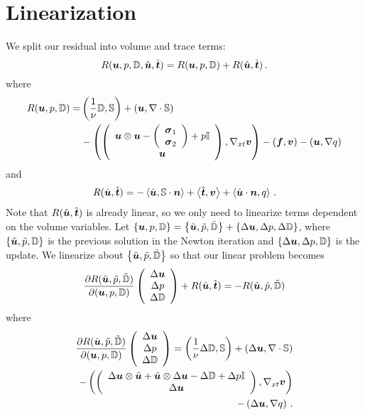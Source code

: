 \documentclass[Dissertation.tex]{subbIles}
\begin{document}
\section{Linearization}
We split our residual into volume and trace terms:
\[
R(\bfu,p,\bbD,\hat\bfu,\hat\bft)=R(\bfu,p,\bbD)+R(\hat\bfu,\hat\bft)\,.
\]
where
\begin{align*}
R(\bfu,p,\bbD)=&
  \LRp{\frac{1}{\nu}\bbD,\bbS}
  +\LRp{\bfu,\Div\bbS}
  \\&
  -\LRp{\vecttwo{\bfu\otimes\bfu-\vecttwo{\bfsigma_1}{\bfsigma_2}+p\bbI}{\bfu},\Gradxt\bfv}
  -(\bff,\bfv)
  -\LRp{\bfu,\Grad q}
\end{align*}
and
\begin{align*}
R(\hat\bfu,\hat\bft)=
  -\LRa{\hat\bfu,\bbS\cdot\bfn}
  +\LRa{\hat\bft,\bfv}
  +\LRa{\hat{\bfu}\cdot\bfn,q}\,.
\end{align*}
Note that $R(\hat\bfu,\hat\bft)$ is already linear, so we only need to linearize terms dependent on 
the volume variables. Let 
$\LRc{\bfu,p,\bbD}=\LRc{\tilde\bfu,\tilde p,\tilde\bbD}+\LRc{\Delta\bfu,\Delta p,\Delta\bbD}$,
where $\LRc{\tilde\bfu,\tilde p,\bbD}$ is the previous solution in the Newton iteration 
and $\LRc{\Delta\bfu,\Delta p,\bbD}$ is the update.
We linearize about $\LRc{\tilde\bfu,\tilde p,\tilde\bbD}$ so that our linear problem becomes
\[
\pd{R(\tilde\bfu,\tilde p,\tilde\bbD)}{(\bfu,p,\bbD)}\vectthree{\Delta\bfu}{\Delta p}{\Delta\bbD}+R(\hat\bfu,\hat\bft)
=-R(\tilde\bfu,\tilde p,\tilde\bbD)
\]
where 
\begin{align*}
\pd{R(\tilde\bfu,\tilde p,\tilde\bbD)}{(\bfu,p,\bbD)}\vectthree{\Delta\bfu}{\Delta p}{\Delta\bbD}=
  \LRp{\frac{1}{\nu}\Delta\bbD,\bbS}
  +\LRp{\Delta\bfu,\Div\bbS}
  \\
  -\LRp{\vecttwo{\Delta\bfu\otimes\tilde\bfu+\tilde\bfu\otimes\Delta\bfu-\Delta\bbD+\Delta p\bbI}
  {\Delta\bfu},\Gradxt\bfv}
  \\
  -\LRp{\Delta\bfu,\Grad q}\,.
\end{align*}
\end{document}
